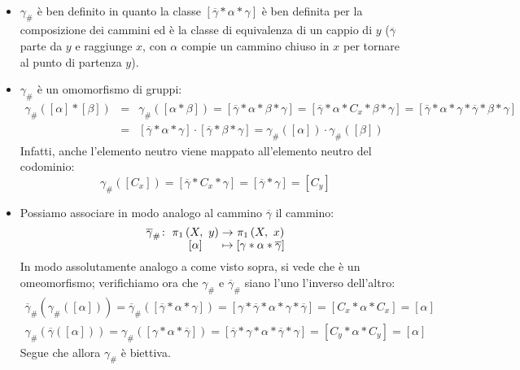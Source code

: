 \begin{demonstration}~{}
	\begin{itemize}
		\item $\gamma_{\#}$ è ben definito in quanto la classe $\left[\overline{\gamma}\ast\alpha\ast\gamma\right]$ è ben definita per la composizione dei cammini ed è la classe di equivalenza di un cappio di $y$ ($\overline{\gamma}$ parte da $y$ e raggiunge $x$, con $\alpha$ compie un cammino chiuso in $x$ per tornare al punto di partenza $y$).
		\item $\gamma_{\#}$ è un omomorfismo di gruppi:
		\begin{equation*}
			\begin{array}{lll}
				\gamma_{\#}\left(\left[\alpha\right]\ast\left[\beta\right]\right)&=&\gamma_{\#}\left(\left[\alpha\ast\beta\right]\right)=\left[\overline{\gamma}\ast\alpha\ast\beta\ast\gamma\right]=\left[\overline{\gamma}\ast\alpha\ast C_x\ast\beta\ast\gamma\right]=\left[\overline{\gamma}\ast\alpha\ast \gamma\ast\overline{\gamma}\ast\beta\ast\gamma\right]\\
				&=&\left[\overline{\gamma}\ast\alpha\ast\gamma\right]\cdot\left[\overline{\gamma}\ast\beta\ast\gamma\right]=\gamma_{\#}\left(\left[\alpha\right]\right)\cdot \gamma_{\#}\left(\left[\beta\right]\right)
			\end{array}
		\end{equation*}
	Infatti, anche l'elemento neutro viene mappato all'elemento neutro del codominio:
	\begin{equation*}
		\gamma_{\#}\left(\left[C_x\right]\right)=\left[\overline{\gamma}\ast C_x\ast\gamma\right]=\left[\overline{\gamma}\ast\gamma\right]=\left[C_y\right]
	\end{equation*}
	\item Possiamo associare in modo analogo al cammino $\overline{\gamma}$ il cammino:
	\begin{equation*}
		\funztot{\overline{\gamma}_{\#}}{\gruf{X}{y}}{\gruf{X}{x}}{\left[\alpha\right]}{\left[\gamma\ast\alpha\ast\overline{\gamma}\right]}
	\end{equation*}
In modo assolutamente analogo a come visto sopra, si vede che è un omeomorfismo; verifichiamo ora che $\gamma_{\#}$ e $\overline{\gamma}_{\#}$ siano l'uno l'inverso dell'altro:
\begin{gather*}
	\overline{\gamma}_{\#}\left(\gamma_{\#}\left(\left[\alpha\right]\right)\right)=\overline{\gamma}_{\#}\left(\left[\overline{\gamma}\ast\alpha\ast\gamma\right]\right)=\left[\gamma\ast\overline{\gamma}\ast\alpha\ast\gamma\ast\overline{\gamma}\right]=\left[C_x\ast\alpha\ast C_x\right]=\left[\alpha\right]\\
	\gamma_{\#}\left(\overline{\gamma}\left(\left[\alpha\right]\right)\right)=
	\gamma_{\#}\left(\left[\gamma\ast\alpha\ast\overline{\gamma}\right]\right)=\left[\overline{\gamma}\ast\gamma\ast\alpha\ast\overline{\gamma}\ast\gamma\right]=\left[C_y\ast\alpha\ast C_y\right]=\left[\alpha\right]
\end{gather*}
Segue che allora $\gamma_{\#}$ è biettiva.
\end{itemize}
\end{demonstration}
